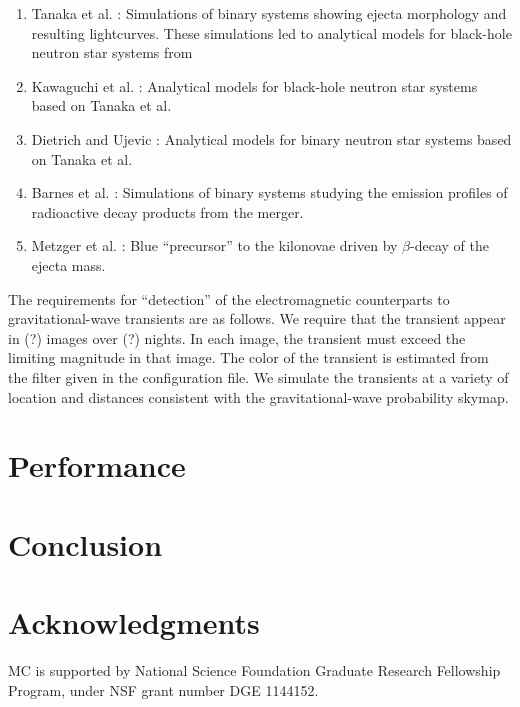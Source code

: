 \documentclass[twocolumn]{aastex61}
\newcommand{\rednote}[1]{{\color{red} (#1)}}
\begin{document}
\begin{enumerate}
\item Tanaka et al. \cite{TaHo2014}: Simulations of binary systems showing ejecta morphology and resulting lightcurves.
These simulations led to analytical models for black-hole neutron star systems from \item Kawaguchi et al. \cite{KaKy2016}: Analytical models for black-hole neutron star systems based on Tanaka et al. \cite{TaHo2014}
\item Dietrich and Ujevic \cite{DiUj2017}: Analytical models for binary neutron star systems based on Tanaka et al. \cite{TaHo2014}
\item Barnes et al. \cite{BaKa2016}: Simulations of binary systems studying the emission profiles of radioactive decay products from the merger.
\item Metzger et al. \cite{MeBa2015}: Blue ``precursor'' to the kilonovae driven by $\beta$-decay of the ejecta mass.
\end{enumerate}

The requirements for ``detection'' of the electromagnetic counterparts to gravitational-wave transients are as follows.
We require that the transient appear in \rednote{?} images over \rednote{?} nights.
In each image, the transient must exceed the limiting magnitude in that image.
The color of the transient is estimated from the filter given in the configuration file.
We simulate the transients at a variety of location and distances consistent with the gravitational-wave probability skymap.


\section{Performance}
\label{sec:performance}

\section{Conclusion}
\label{sec:conclusions}

\section{Acknowledgments}
MC is supported by National Science Foundation Graduate Research Fellowship Program, under NSF grant number DGE 1144152.



\end{document}
